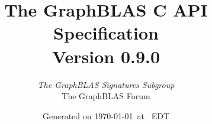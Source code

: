 \documentclass[11pt]{extbook}
\begin{document}
\linenumbers

\title{The GraphBLAS C API Specification\\ {\large Version 0.9.0}}
\author{\emph{\large The \emph{GraphBLAS} Signatures Subgroup}\\ The GraphBLAS Forum}
\date{Generated on \today\ at \currenttime\ EDT}

\renewcommand{\vector}[1]{{\bf #1}}
\renewcommand{\matrix}[1]{{\bf #1}}
\renewcommand{\arg}[1]{{\sf #1}}
\newcommand{\zip}{{\mbox{zip}}}
\newcommand{\zap}{{\mbox{zap}}}
\newcommand{\ewiseadd}{{\mbox{\bf ewiseadd}}}
\newcommand{\ewisemult}{{\mbox{\bf ewisemult}}}
\newcommand{\mxm}{{\mbox{\bf mxm}}}
\newcommand{\vxm}{{\mbox{\bf vxm}}}
\newcommand{\mxv}{{\mbox{\bf mxv}}}
\newcommand{\gpit}[1]{{\sf #1}}
\newcommand{\ie}{\emph{i.e.}}
\newcommand{\eg}{\emph{e.g.}}
\newcommand{\nan}{{\sf NaN}}
\newcommand{\nil}{{\bf nil}}
\newcommand{\ifif}{{\bf if}}
\newcommand{\ifthen}{{\bf then}}
\newcommand{\ifelse}{{\bf else}}
\newcommand{\ifendif}{{\bf endif}}
\newcommand{\zero}{{\bf 0}}
\newcommand{\one}{{\bf 1}}
\newcommand{\true}{{\sf true}}
\newcommand{\false}{{\sf false}}
\newcommand{\syntax}{{C Syntax}}

\newcommand{\aydin}[1]{{{\color{orange}[Aydin: #1]}}}
\newcommand{\scott}[1]{{{\color{violet}[Scott: #1]}}}
\newcommand{\tim}[1]{{{\color{teal}[Tim: #1]}}}
\newcommand{\jose}[1]{{{\color{red}[Jose: #1]}}}
\newcommand{\carl}[1]{{{\color{blue}[Carl: #1]}}}
\newcommand{\ajy}[1]{{{\color{brown}[Yzelman: #1]}}}



\renewcommand{\comment}[1]{{}}
\newcommand{\glossBegin}{\begin{itemize}}
\newcommand{\glossItem}[1]{\item \emph{#1}: }
\newcommand{\glossEnd}{\end{itemize}}

\setlength{\parskip}{0.5\baselineskip}
\setlength{\parindent}{0ex}

\maketitle

\vfill


\comment{
\begin{center}
{\Large \copyright All Rights Reserved.}
\end{center}
}
\end{document}
